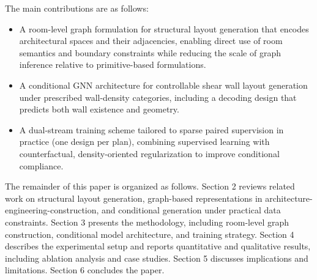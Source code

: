 The main contributions are as follows:

\begin{itemize}
\item A room-level graph formulation for structural layout generation that encodes architectural spaces and their adjacencies, enabling direct use of room semantics and boundary constraints while reducing the scale of graph inference relative to primitive-based formulations.
\item A conditional GNN architecture for controllable shear wall layout generation under prescribed wall-density categories, including a decoding design that predicts both wall existence and geometry.
\item A dual-stream training scheme tailored to sparse paired supervision in practice (one design per plan), combining supervised learning with counterfactual, density-oriented regularization to improve conditional compliance.
\end{itemize}

The remainder of this paper is organized as follows. Section 2 reviews related work on structural layout generation, graph-based representations in architecture-engineering-construction, and conditional generation under practical data constraints. Section 3 presents the methodology, including room-level graph construction, conditional model architecture, and training strategy. Section 4 describes the experimental setup and reports quantitative and qualitative results, including ablation analysis and case studies. Section 5 discusses implications and limitations. Section 6 concludes the paper.
